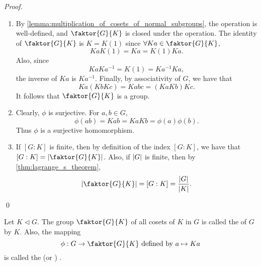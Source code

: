 \begin{proof}
  \begin{enumerate}
    \item By \cref{lemma:multiplication_of_cosets_of_normal_subgroups}, the operation is well-defined, and $\faktor{G}{K}$ is closed under the operation. The identity of $\faktor{G}{K}$ is $K = K(1)$ since $\forall Ka \in \faktor{G}{K}$,
      \begin{equation*}
        Ka K(1) = Ka = K(1) Ka.
      \end{equation*}
      Also, since
      \begin{equation*}
        Ka Ka^{-1} = K(1) = Ka^{-1} Ka,
      \end{equation*}
      the inverse of $Ka$ is $Ka^{-1}$. Finally, by associativity of $G$, we have that
      \begin{equation*}
        Ka(KbKc) = Kabc = (KaKb)Kc.
      \end{equation*}
      It follows that $\faktor{G}{K}$ is a group.

    \item Clearly, $\phi$ is surjective. For $a, b \in G$,
      \begin{equation*}
        \phi(ab) = Kab = Ka Kb = \phi(a) \phi(b).
      \end{equation*}
      Thus $\phi$ is a surjective homomorphism.

    \item If $[G : K]$ is finite, then by definition of the index $[G : K]$, we have that $[G : K] = \abs{\faktor{G}{K}}$. Also, if $\left|G\right|$ is finite, then by \cref{thm:lagrange_s_theorem},
      \begin{equation*}
        \abs{\faktor{G}{K}} = [G : K] = \frac{\abs{G}}{\abs{K}}.
      \end{equation*}
  \end{enumerate}\qed
\end{proof}

\begin{defn}
\label{defn:quotient_group}
  Let $K \triangleleft G$. The group $\faktor{G}{K}$ of all cosets of $K$ in $G$ is called the  of $G$ by $K$. Also, the mapping
  \begin{equation*}
    \phi: G \to \faktor{G}{K} \text{ defined by } a \mapsto Ka
  \end{equation*}
  is called the  (or ) .
\end{defn}

